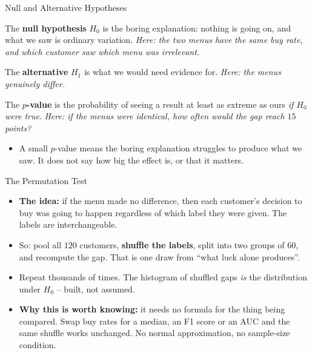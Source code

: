 \begin{frame}{Null and Alternative Hypotheses}
\begin{rldefinition}
The \textbf{null hypothesis} $H_0$ is the boring explanation: nothing is going on, and what we saw is ordinary variation. \emph{Here: the two menus have the same buy rate, and which customer saw which menu was irrelevant.}

\smallskip
The \textbf{alternative} $H_1$ is what we would need evidence for. \emph{Here: the menus genuinely differ.}

\smallskip
The \textbf{$p$-value} is the probability of seeing a result at least as extreme as ours \emph{if $H_0$ were true}. \emph{Here: if the menus were identical, how often would the gap reach $15$ points?}
\end{rldefinition}
\pause
\begin{itemize}
  \item A small $p$-value means the boring explanation struggles to produce what we saw. It does not say how big the effect is, or that it matters.
\end{itemize}
\end{frame}

\begin{frame}{The Permutation Test}
\begin{itemize}
  \item \textbf{The idea:} if the menu made no difference, then each customer's decision to buy was going to happen regardless of which label they were given. The labels are interchangeable.
  \pause
  \item So: pool all $120$ customers, \textbf{shuffle the labels}, split into two groups of $60$, and recompute the gap. That is one draw from ``what luck alone produces''.
  \pause
  \item Repeat thousands of times. The histogram of shuffled gaps \emph{is} the distribution under $H_0$ -- built, not assumed.
  \pause
  \item \textbf{Why this is worth knowing:} it needs no formula for the thing being compared. Swap buy rates for a median, an F1 score or an AUC and the same shuffle works unchanged. No normal approximation, no sample-size condition.
\end{itemize}
\end{frame}


